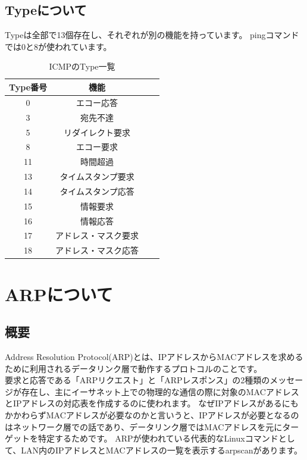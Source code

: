 \subsection{Typeについて}
Typeは全部で13個存在し、それぞれが別の機能を持っています。
pingコマンドでは0と8が使われています。
\begin{table}[bth]
    \begin{center}
        \caption{ICMPのType一覧}
        \label{icmp-type}
            \begin{tabular}{|c|c|c|c|} \hline
                Type番号 & 機能\\ \hline
                0 & エコー応答 \\ \hline
                3 & 宛先不達 \\ \hline
                5 & リダイレクト要求 \\ \hline
                8 & エコー要求 \\ \hline
                11 & 時間超過 \\ \hline
                13 & タイムスタンプ要求 \\ \hline
                14 & タイムスタンプ応答 \\ \hline
                15 & 情報要求 \\ \hline
                16 & 情報応答 \\ \hline
                17 & アドレス・マスク要求 \\ \hline
                18 & アドレス・マスク応答 \\ \hline
            \end{tabular}
    \end{center}
\end{table}

\section{ARPについて}
\subsection{概要}
Address Resolution Protocol(ARP)とは、IPアドレスからMACアドレスを求めるために利用されるデータリンク層で動作するプロトコルのことです。\\
要求と応答である「ARPリクエスト」と「ARPレスポンス」の2種類のメッセージが存在し、主にイーサネット上での物理的な通信の際に対象のMACアドレスとIPアドレスの対応表を作成するのに使われます。
なぜIPアドレスがあるにもかかわらずMACアドレスが必要なのかと言いうと、IPアドレスが必要となるのはネットワーク層での話であり、データリンク層ではMACアドレスを元にターゲットを特定するためです。
ARPが使われている代表的なLinuxコマンドとして、LAN内のIPアドレスとMACアドレスの一覧を表示するarpscanがあります。


